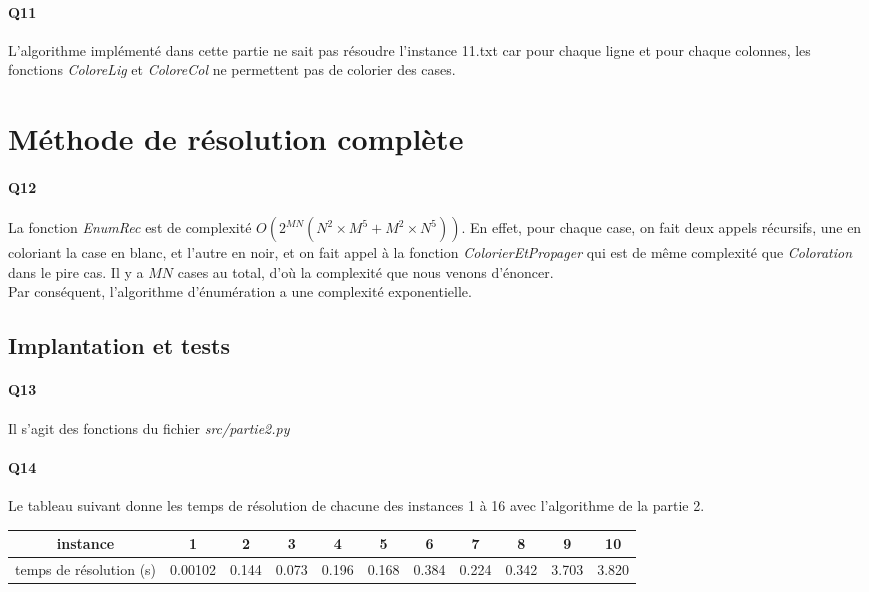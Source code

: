 \documentclass[12pt]{article}
\begin{document}
			\paragraph{Q11}
				L'algorithme implémenté dans cette partie ne sait pas résoudre l'instance 11.txt car pour chaque ligne et pour chaque colonnes, les fonctions \textit{ColoreLig} et \textit{ColoreCol} ne permettent pas de colorier des cases.
	
	
	\section{Méthode de résolution complète}
		
		\paragraph{Q12}
		
			La fonction \textit{EnumRec} est de complexité $ \boxed{O(2^{MN}(N^2 \times M^5 + M^2 \times N^5)) } $. En effet, pour chaque case, on fait deux appels récursifs, une en coloriant la case en blanc, et l'autre en noir, et on fait appel à la fonction \textit{ColorierEtPropager} qui est de même complexité que \textit{Coloration} dans le pire cas. Il y a $ MN $ cases au total, d'où la complexité que nous venons d'énoncer. \\
			Par conséquent, l'algorithme d'énumération a une complexité exponentielle.
		
		\subsection{Implantation et tests}
		
			\paragraph{Q13}
				Il s'agit des fonctions du fichier \textit{src/partie2.py}
		
			\paragraph{Q14}
				Le tableau suivant donne les temps de résolution de chacune des instances 1 à 16 avec l'algorithme de la partie 2.
				\begin{center}
					\begin{tabular}{|c|c|c|c|c|c|c|c|c|c|c| }
						\hline
						instance & 1 & 2 & 3 & 4 & 5 & 6 & 7 & 8 & 9 & 10 \\ \hline
						temps de résolution (s) & 0.00102 & 0.144 & 0.073 & 0.196 & 0.168 & 0.384 & 0.224 & 0.342 & 3.703 & 3.820 \\ \hline
					\end{tabular}
				\end{center}
			
\end{document}
